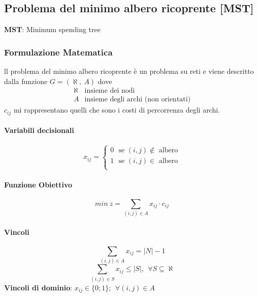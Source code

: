 \documentclass[12pt,a4paper]{article}
\begin{document}
\subsection{Problema del minimo albero ricoprente [MST]}
\textbf{MST}: Minimum spending tree
\subsubsection{Formulazione Matematica}
ll problema del minimo albero ricoprente è un problema su reti e viene descritto dalla funzione $G=(\aleph,\ A)$ dove $$\begin{array}{ll}\aleph & \text{insieme dei nodi}\\A & \text{insieme degli archi (non orientati)}\end{array}$$
$c_{ij}$ mi rappresentano quelli che sono i costi di percorrenza degli archi.
\paragraph{Variabili decisionali} $$x_{ij} = \begin{cases}
0 \ \ \ \text{se $(i,j)\not \in$ albero}\\
1 \ \ \ \text{se $(i,j) \in$ albero}\\
\end{cases}$$
\paragraph{Funzione Obiettivo} $$min\ z = \sum_{(i,j)\in A} x_{ij}\cdot c_{ij}$$
\paragraph{Vincoli}
$$\sum_{(i,j) \in A} x_{ij}= |N| - 1$$
$$\sum_{(i,j) \in S} x_{ij} \leq |S|, \ \ \forall S \subseteq \aleph$$
\textbf{Vincoli di dominio}: $x_{ij} \in \{0;1\}; \ \ \forall (i,j) \in A$\\
\end{document}
